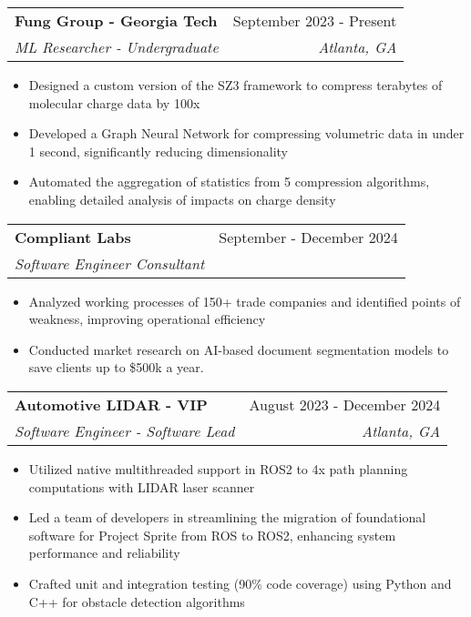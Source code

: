 \documentclass[letterpaper,10pt]{article}
\makeatletter
\newcommand{\resumeItem}[1]{
  \item\small{
    {#1 \vspace{-2pt}}
  }
}
\newcommand{\resumeSubheading}[4]{%
\vspace{-1pt}%
  \item
    \begin{tabular*}{0.97\textwidth}{l@{\extracolsep{\fill}}r}
      \textbf{#1} & #2 \\
      \textit{\small#3} & \textit{\small #4} \\

    \end{tabular*}%
  \vspace{-5pt}
}
\newcommand{\resumeItemListStart}{\begin{itemize}}
\newcommand{\resumeItemListEnd}{\end{itemize}\vspace{-5pt}}
\makeatother
\begin{document}
			\resumeSubheading
			{Fung Group - Georgia Tech}{September 2023 - Present}
			{ML Researcher - Undergraduate}{Atlanta, GA}
			\resumeItemListStart
				\resumeItem{Designed a custom version of the SZ3 framework to compress terabytes of molecular charge data by 100x}
				\resumeItem{Developed a Graph Neural Network for compressing volumetric data in under 1 second, significantly reducing dimensionality}
				\resumeItem{Automated the aggregation of statistics from 5 compression algorithms, enabling detailed analysis of impacts on charge density}
			\resumeItemListEnd

			\resumeSubheading
			{Compliant Labs}{September - December 2024}
			{Software Engineer Consultant}{}
			\resumeItemListStart
				\resumeItem{Analyzed working processes of 150+ trade companies and identified points of weakness, improving operational efficiency}
				\resumeItem{Conducted market research on AI-based document segmentation models to save clients up to \$500k a year.}
			\resumeItemListEnd

			\resumeSubheading
			{Automotive LIDAR - VIP}{August 2023 - December 2024}
			{Software Engineer - Software Lead}{Atlanta, GA}
			\resumeItemListStart
				\resumeItem{Utilized native multithreaded support in ROS2 to 4x path planning computations with LIDAR laser scanner}
				\resumeItem{Led a team of developers in streamlining the migration of foundational software for Project Sprite from ROS to ROS2, enhancing system performance and reliability}
				\resumeItem{Crafted unit and integration testing (90\% code coverage) using Python and C++ for obstacle detection algorithms}
			\resumeItemListEnd

			\begin{comment}
			\resumeSubheading
			{System Technology Works}{January - May 2023}
			{Software Engineer Intern}{Peachtree Corners, GA}
			\resumeItemListStart
				\resumeItem{Designed 10+ movements for humanoid robot Zeus2Q, including algorithms for bipedal walking and grabbing}
				\resumeItem{Integrated the NVIDIA Riva SDK to enable real-time conversational AI utilizing leading LLMs and RAG}
				\resumeItem{Prepared technical documentation videos for Zeus2Q's Python API, allowing for interfacing by customers}
			\resumeItemListEnd
			\end{comment}
\end{document}
